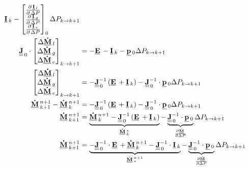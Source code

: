 \begin{align}
\vec{I}_{k} -
\begin{bmatrix}
\DerivParOne{\vec{I}_{l}}{\Delta P} \\
\DerivParOne{\vec{I}_{g}}{\Delta P} \\
\DerivParOne{\vec{I}_{e}}{\Delta P}
\end{bmatrix}_{0}
\Delta P_{k \rightarrow k+1} \\
\mat{J}_{\,0}
\cdot
\begin{bmatrix}
\Delta \vec{\dot{M}}_l \\
\Delta \vec{\dot{M}}_g \\
\Delta \vec{\dot{M}}_e
\end{bmatrix}_{k\rightarrow k+1} & =
-\vec{E} -
\vec{I}_{k} -
\vec{p}_{0}
\Delta P_{k \rightarrow k+1} \\
\begin{bmatrix}
\Delta \vec{\dot{M}}_l \\
\Delta \vec{\dot{M}}_g \\
\Delta \vec{\dot{M}}_e
\end{bmatrix}_{k\rightarrow k+1} & =
-\mat{J}_{\,0}^{-1}\left(\vec{E} + \vec{I}_{k}\right) -
\mat{J}_{\,0}^{-1} \cdot \vec{p}_{0} \Delta P_{k \rightarrow k+1} \\
\vec{\dot{M}}^{n+1}_{k+1}- \vec{\dot{M}}^{n+1}_{k} & =
-\mat{J}_{\,0}^{-1}\left(\vec{E} + \vec{I}_{k}\right) -
\mat{J}_{\,0}^{-1} \cdot \vec{p}_{0} \Delta P_{k \rightarrow k+1}\\
\vec{\dot{M}}^{n+1}_{k+1} & =
\underbrace{\vec{\dot{M}}^{n+1}_{k} -\mat{J}_{\,0}^{-1}\left(\vec{E} + \vec{I}_{k}\right)}_{\vec{\dot{M}}^{*}_{k}} - \underbrace{\mat{J}_{\,0}^{-1} \cdot \vec{p}_{0}}_{\frac{\partial \vec{\dot{M}}}{\partial \Delta P}} \Delta P_{k \rightarrow k+1} \\
\vec{\dot{M}}^{n+1}_{k+1} & =
\underbrace{-\mat{J}_{\,0}^{-1}\cdot \vec{E} + \vec{\dot{M}}^{n+1}_{k} - \mat{J}^{-1}_{\,0}\cdot \vec{I}_{k}}_{\vec{\dot{M}}^{n+1}_{*}} - \underbrace{\mat{J}_{\,0}^{-1} \cdot \vec{p}_{0}}_{\frac{\partial \vec{\dot{M}}}{\partial \Delta P}} \Delta P_{k \rightarrow k+1}
\end{align}

